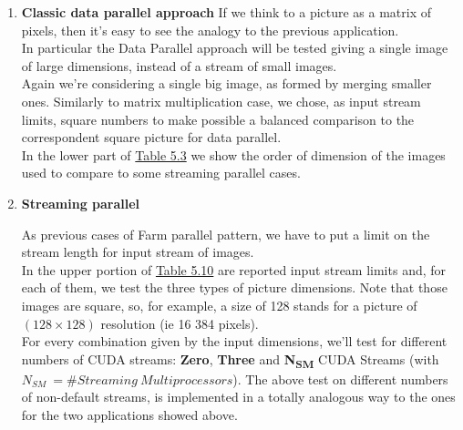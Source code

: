 \begin{enumerate}
	\item \textbf{Classic data parallel approach}
	If we think to a picture as a matrix of pixels, then it's easy to see the analogy to the previous application.\\
	In particular the Data Parallel approach will be tested giving a single image of large dimensions, instead of a stream of small images.\\
	Again we're considering a single big image, as formed by merging smaller ones. Similarly to matrix multiplication case, we chose, as input stream limits, square numbers to make possible a balanced comparison to the correspondent square picture for data parallel.\\
	In the lower part of \hyperref[tab:imgdata]{Table 5.3} we show the order of dimension of the images used to compare to some streaming parallel cases.
	
	\item \textbf{Streaming parallel}
	
	As previous cases of Farm parallel pattern, we have to put a limit on the stream length for input stream of images.\\
	In the upper portion of \hyperref[tab:imgdata]{Table 5.10} are reported input stream limits and, for each of them, we test the three types of picture dimensions. Note that those images are square, so, for example, a size of 128 stands for a picture of \((128\times128)\) resolution (ie 16 384 pixels).\\
	For every combination given by the input dimensions, we'll test for different numbers of CUDA streams: \textbf{Zero}, \textbf{Three} and \textbf{N\textsubscript{SM}} CUDA Streams (with \(N_{SM} \ =\# Streaming \ Multiprocessors\)).
	The above test on different numbers of non-default streams, is implemented in a totally analogous way to the ones for the two applications showed above.
	
\end{enumerate}




